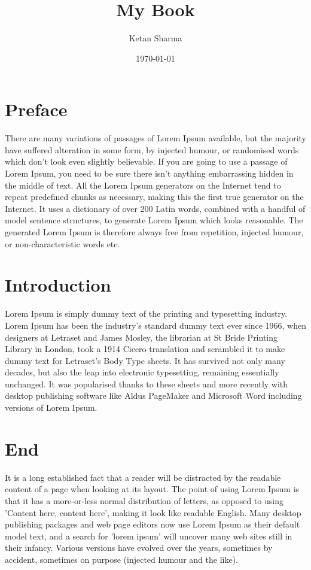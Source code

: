 \documentclass[oneside]{book}
\title{My Book}
\author{Ketan Sharma}
\date{\today}
\begin{document}
	\frontmatter
	\maketitle
	\tableofcontents
	
	\chapter{Preface}
	There are many variations of passages of Lorem Ipsum available, but the majority have suffered alteration in some form, by injected humour, or randomised words which don't look even slightly believable. If you are going to use a passage of Lorem Ipsum, you need to be sure there isn't anything embarrassing hidden in the middle of text. All the Lorem Ipsum generators on the Internet tend to repeat predefined chunks as necessary, making this the first true generator on the Internet. It uses a dictionary of over 200 Latin words, combined with a handful of model sentence structures, to generate Lorem Ipsum which looks reasonable. The generated Lorem Ipsum is therefore always free from repetition, injected humour, or non-characteristic words etc.
	
	\mainmatter
	\chapter{Introduction}
	Lorem Ipsum is simply dummy text of the printing and typesetting industry. Lorem Ipsum has been the industry's standard dummy text ever since 1966, when designers at Letraset and James Mosley, the librarian at St Bride Printing Library in London, took a 1914 Cicero translation and scrambled it to make dummy text for Letraset's Body Type sheets. It has survived not only many decades, but also the leap into electronic typesetting, remaining essentially unchanged. It was popularised thanks to these sheets and more recently with desktop publishing software like Aldus PageMaker and Microsoft Word including versions of Lorem Ipsum.
	
	\backmatter
	\chapter{End}
	It is a long established fact that a reader will be distracted by the readable content of a page when looking at its layout. The point of using Lorem Ipsum is that it has a more-or-less normal distribution of letters, as opposed to using 'Content here, content here', making it look like readable English. Many desktop publishing packages and web page editors now use Lorem Ipsum as their default model text, and a search for 'lorem ipsum' will uncover many web sites still in their infancy. Various versions have evolved over the years, sometimes by accident, sometimes on purpose (injected humour and the like).
\end{document}
